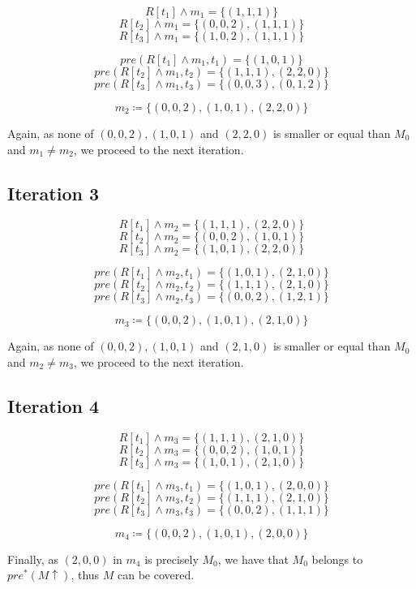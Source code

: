 \documentclass{article}
\begin{document}
$$R[t_1] \land m_1 = \{ (1, 1, 1) \}$$
$$R[t_2] \land m_1 = \{ (0, 0, 2), (1, 1, 1) \}$$
$$R[t_3] \land m_1 = \{ (1, 0, 2), (1, 1, 1) \}$$

$$pre(R[t_1] \land m_1, t_1) = \{ (1, 0, 1) \}$$
$$pre(R[t_2] \land m_1, t_2) = \{ (1, 1, 1), (2, 2, 0) \}$$
$$pre(R[t_3] \land m_1, t_3) = \{ (0, 0, 3), (0, 1, 2) \}$$

$$m_2 \coloneqq \{ (0, 0, 2), (1, 0, 1), (2, 2, 0) \}$$

Again, as none of $(0, 0, 2), (1, 0, 1)$ and $(2, 2, 0)$ is 
smaller or equal than $M_0$ and $m_1 \neq m_2$, we proceed to the 
next iteration.

\subsection*{Iteration 3}

$$R[t_1] \land m_2 = \{ (1, 1, 1), (2, 2, 0) \}$$
$$R[t_2] \land m_2 = \{ (0, 0, 2), (1, 0, 1) \}$$
$$R[t_3] \land m_2 = \{ (1, 0, 1), (2, 2, 0) \}$$

$$pre(R[t_1] \land m_2, t_1) = \{ (1, 0, 1), (2, 1, 0) \}$$
$$pre(R[t_2] \land m_2, t_2) = \{ (1, 1, 1), (2, 1, 0) \}$$
$$pre(R[t_3] \land m_2, t_3) = \{ (0, 0, 2), (1, 2, 1) \}$$

$$m_3 \coloneqq \{ (0, 0, 2), (1, 0, 1), (2, 1, 0) \}$$

Again, as none of $(0, 0, 2), (1, 0, 1)$ and $(2, 1, 0)$ is 
smaller or equal than $M_0$ and $m_2 \neq m_3$, we proceed to the 
next iteration.

\subsection*{Iteration 4}

$$R[t_1] \land m_3 = \{ (1, 1, 1), (2, 1, 0) \}$$
$$R[t_2] \land m_3 = \{ (0, 0, 2), (1, 0, 1) \}$$
$$R[t_3] \land m_3 = \{ (1, 0, 1), (2, 1, 0) \}$$

$$pre(R[t_1] \land m_3, t_1) = \{ (1, 0, 1), (2, 0, 0) \}$$
$$pre(R[t_2] \land m_3, t_2) = \{ (1, 1, 1), (2, 1, 0) \}$$
$$pre(R[t_3] \land m_3, t_3) = \{ (0, 0, 2), (1, 1, 1) \}$$

$$m_4 \coloneqq \{ (0, 0, 2), (1, 0, 1), (2, 0, 0) \}$$

Finally, as $(2, 0, 0)$ in $m_4$ is precisely $M_0$, we have 
that $M_0$ belongs to $pre^{*}(M\uparrow)$, thus $M$ can 
be covered.
\end{document}
